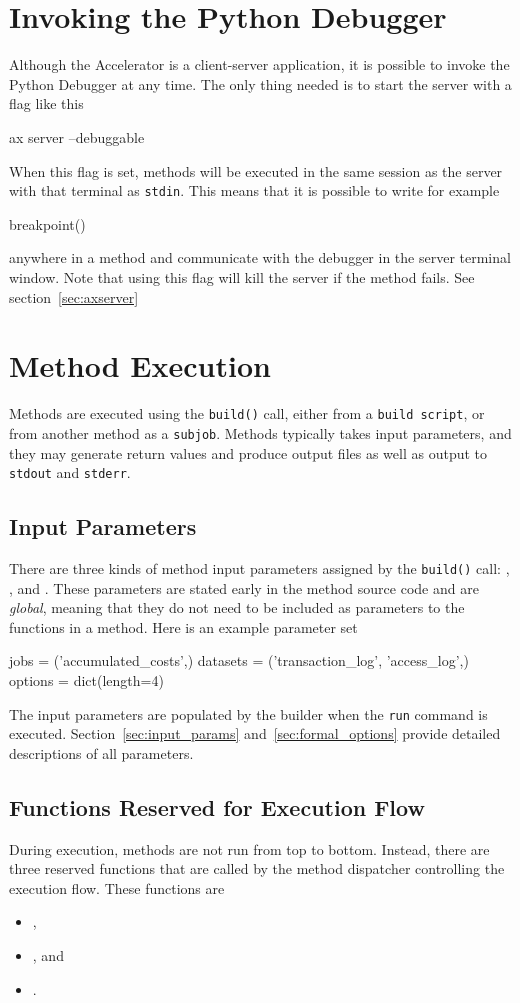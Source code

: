 \section{Invoking the Python Debugger}
Although the Accelerator is a client-server application, it is
possible to invoke the Python Debugger at any time.  The only thing
needed is to start the server with a flag like this
\begin{shell}
ax server --debuggable
\end{shell}
When this flag is set, methods will be executed in the same session as
the server with that terminal as \texttt{stdin}.  This means that it
is possible to write for example
\begin{python}
breakpoint()
\end{python}
anywhere in a method and communicate with the debugger in the server
terminal window.  Note that using this flag will kill the server if
the method fails.  See section~\ref{sec:axserver}



\section{Method Execution}
Methods are executed using the \texttt{build()} call, either from a
\texttt{build script}, or from another method as a \texttt{subjob}.
Methods typically takes input parameters, and they may generate return
values and produce output files as well as output to \texttt{stdout}
and \texttt{stderr}.


\subsection{Input Parameters}
There are three kinds of method input parameters assigned by the
\texttt{build()} call: \jobs, \datasets, and \options.  These
parameters are stated early in the method source code and are
\textsl{global}, meaning that they do not need to be included as
parameters to the functions in a method.  Here is an example parameter
set
\begin{python}
jobs = ('accumulated_costs',)
datasets = ('transaction_log', 'access_log',)
options = dict(length=4)
\end{python}
The input parameters are populated by the builder when the
\texttt{run} command is executed.  Section~\ref{sec:input_params}
and~\ref{sec:formal_options} provide detailed descriptions of all
parameters.


\subsection{Functions Reserved for Execution Flow}
During execution, methods are not run from top to bottom.  Instead,
there are three reserved functions that are called by the method
dispatcher controlling the execution flow.  These functions are
\begin{itemize}
\item [] \prepare,
\item [] \analysis, and
\item [] \synthesis.
\end{itemize}


